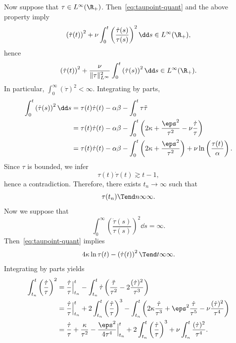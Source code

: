 Now suppose that $\tau\in L^\infty(\R_+)$. Then~\eqref{eq:taupoint-quant} and the above property imply
\begin{equation*}
\left(\dot \tau(t)\right)^2+\nu\int_0^t\left(\frac{\dot
\tau(s)}{\tau(s)}\right)^2\dd s\in L^\infty(\R_+),
\end{equation*}
hence
\begin{equation*}
\left(\dot \tau(t)\right)^2+\frac{\nu}{\|\tau\|_{L^\infty}^2}\int_0^t\left(\dot
\tau(s)\right)^2\dd s\in L^\infty(\R_+).
\end{equation*}
In particular, $\int_0^\infty (\dot \tau)^2<\infty$. Integrating by parts,
\begin{align*}
\int_0^t\left(\dot \tau(s)\right)^2\dd s&=\tau(t)\dot\tau(t) - \alpha\beta-\int_0^t\tau\ddot \tau \phantom{\left(\int\right)} \\
&= \tau(t)\dot\tau(t) - \alpha\beta-\int_0^t\left(2\kappa + \frac{\eps^2}{\tau^2} -\nu\frac{\dot \tau}{\tau}\right)\\
& = \tau(t)\dot\tau(t) -
\alpha\beta-\int_0^t\left(2\kappa + \frac{\eps^2}{\tau^2}\right) +\nu\ln\left(\frac{\tau(t)}{\alpha}\right).
\end{align*}
Since $\tau$ is bounded, we infer
\begin{equation*}
\tau(t)\dot\tau(t) \gtrsim t-1,
\end{equation*}
hence a contradiction. Therefore, there exists $t_n\to \infty$ such that
\begin{equation*}
\tau(t_n)\Tend n \infty \infty.
\end{equation*}
Now we suppose that
\begin{equation}\label{eq:intDV}
\int_0^\infty\left(\frac{\dot \tau(s)}{\tau(s)}\right)^2\dd s=\infty.
\end{equation}
Then~\eqref{eq:taupoint-quant} implies
\begin{equation}\label{eq:DVbrutale}
4\kappa\ln \tau(t) - \left(\dot \tau(t)\right)^2\Tend t \infty \infty.
\end{equation}
Integrating by parts yields
\begin{align*}
\int_{t_n}^t \left(\frac{\dot \tau}{\tau}\right)^2 & =
\frac{\dot\tau}{\tau}\Big|_{t_n}^t - \int_{t_n}^t \dot \tau \left(
\frac{\ddot \tau}{\tau^2} - 2\frac{(\dot \tau)^2}{\tau^3}\right)\\
&= \frac{\dot\tau}{\tau}\Big|_{t_n}^t +2 \int_{t_n}^t \left(\frac{\dot
\tau}{\tau}\right)^3 -\int_{t_n}^t \left(2\kappa \frac{\dot \tau}{\tau^3} +\eps^2\frac{\dot \tau}{\tau^5}-\nu \frac{(\dot \tau)^2}{\tau^4}\right)\\
& =
\frac{\dot\tau}{\tau}+\frac{\kappa}{\tau^2}-\frac{\eps^2}{4\tau^4}\Big|_{t_n}^t +2 \int_{t_n}^t \left(\frac{\dot \tau}{\tau}\right)^3 +\nu \int_{t_n}^t
\frac{(\dot \tau)^2}{\tau^4}.
\end{align*}
